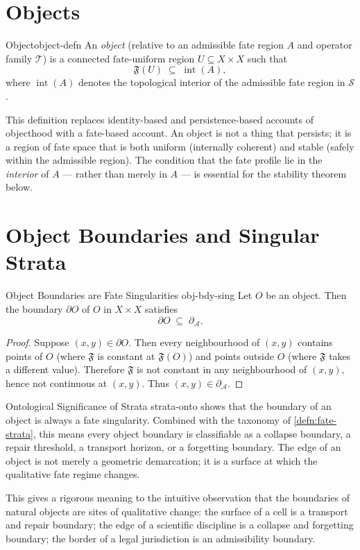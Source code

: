 \documentclass[12pt,twoside,openright]{book}
\newcommand{\transfam}{\mathcal{T}}       %
\newcommand{\distPairs}{X\times X}
\newcommand{\fateMap}{\mathfrak{F}}
\newcommand{\fateSpace}{\mathcal{S}}
\newcommand{\singSet}{\partial_{\!\mathcal{A}}}
\newcommand{\admRegion}{A}
\newcommand{\objBdy}{\partial O}
\newcommand{\fateUnif}{\text{fate-uniform}}
\providecommand{\singSet}{\partial_{\!\mathcal{A}}}
\providecommand{\admRegion}{A}
\providecommand{\objBdy}{\partial O}
\providecommand{\fateUnif}{\text{fate-uniform}}
\begin{document}
\section{Objects}

\begin{definition}{Object}{object-defn}
An \emph{object} (relative to an admissible fate region
$\admRegion$ and operator family $\transfam$) is a connected
$\fateUnif$ region $U\subseteq\distPairs$ such that
\[
  \fateMap(U)\;\subseteq\;\operatorname{int}(\admRegion),
\]
where $\operatorname{int}(\admRegion)$ denotes the topological
interior of the admissible fate region in $\fateSpace$.
\end{definition}

This definition replaces identity-based and persistence-based
accounts of objecthood with a fate-based account. An object is
not a thing that persists; it is a region of fate space that
is both uniform (internally coherent) and stable (safely within
the admissible region). The condition that the fate profile lie
in the \emph{interior} of $\admRegion$ --- rather than merely
in $\admRegion$ --- is essential for the stability theorem below.

\section{Object Boundaries and Singular Strata}

\begin{proposition}{Object Boundaries are Fate Singularities}%
  {obj-bdy-sing}
Let $O$ be an object. Then the boundary $\objBdy$ of $O$ in
$\distPairs$ satisfies
\[
  \objBdy\;\subseteq\;\singSet.
\]
\begin{proof}
Suppose $(x,y)\in\objBdy$. Then every neighbourhood of $(x,y)$
contains points of $O$ (where $\fateMap$ is constant at
$\fateMap(O)$) and points outside $O$ (where $\fateMap$ takes
a different value). Therefore $\fateMap$ is not constant in any
neighbourhood of $(x,y)$, hence not continuous at $(x,y)$.
Thus $(x,y)\in\singSet$.
\end{proof}
\end{proposition}

\begin{remark}{Ontological Significance of Strata}%
  {strata-onto}
 shows that the boundary of an object
is always a fate singularity. Combined with the taxonomy of
\cref{defn:fate-strata}, this means every object boundary is
classifiable as a collapse boundary, a repair threshold, a
transport horizon, or a forgetting boundary. The edge of an
object is not merely a geometric demarcation; it is a surface
at which the qualitative fate regime changes.

This gives a rigorous meaning to the intuitive observation that
the boundaries of natural objects are sites of qualitative
change: the surface of a cell is a transport and repair
boundary; the edge of a scientific discipline is a collapse
and forgetting boundary; the border of a legal jurisdiction is
an admissibility boundary.
\end{remark}
\end{document}
